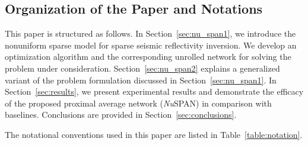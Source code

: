 \documentclass[journal]{IEEEtran}
\begin{document}
\subsection{Organization of the Paper and Notations}
This paper is structured as follows. In Section~\ref{sec:nu_span1}, we introduce the nonuniform sparse model for sparse seismic reflectivity inversion. We develop an optimization algorithm and the corresponding unrolled network for solving the problem under consideration. Section~\ref{sec:nu_span2} explains a generalized variant of the problem formulation discussed in Section~\ref{sec:nu_span1}. In Section~\ref{sec:results}, we present experimental results and demonstrate the efficacy of the proposed proximal average network ({\it Nu}SPAN) in comparison with baselines. Conclusions are provided in Section~\ref{sec:conclusions}.

The notational conventions used in this paper are listed in Table~\ref{table:notation}.

\begin{table}[t]
    \centering
    \caption{Notations}
    \label{table:notation}
\end{table}
\end{document}
